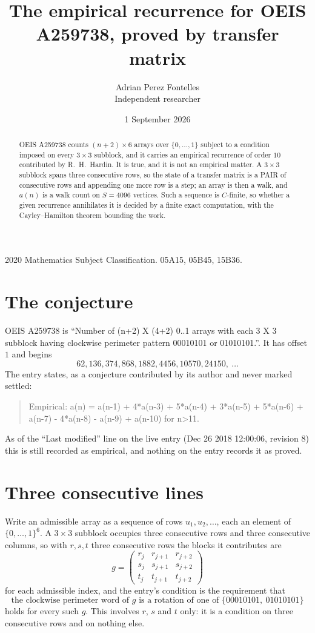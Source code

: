 \documentclass[11pt,a4paper]{article}
\title{The empirical recurrence for OEIS A259738, proved by transfer matrix}
\author{Adrian Perez Fontelles\\ \small Independent researcher}
\date{1 September 2026}
\theoremstyle{plain}
\theoremstyle{definition}
\begin{document}
\maketitle

\begin{abstract}
OEIS A259738 counts $(n+2)\times6$ arrays over $\{0,\dots,1\}$ subject to a condition imposed on
every $3\times3$ subblock, and it carries an empirical recurrence of order $10$
contributed by R.~H.~Hardin. It is true, and it is not an empirical matter. A $3\times3$
subblock spans three consecutive rows, so the state of a transfer matrix is a PAIR of
consecutive rows and appending one more row is a step; an array is then a walk, and
$a(n)$ is a walk count on $S=4096$ vertices. Such a sequence is $C$-finite, so whether a given
recurrence annihilates it is decided by a finite exact computation, with the Cayley--Hamilton
theorem bounding the work.
\end{abstract}

\noindent\small 2020 Mathematics Subject Classification. 05A15, 05B45, 15B36.\normalsize

\section{The conjecture}

OEIS A259738 is ``Number of (n+2) X (4+2) 0..1 arrays with each 3 X 3 subblock having clockwise perimeter pattern 00010101 or 01010101.''. It has offset $1$ and begins
\[
62, 136, 374, 868, 1882, 4456, 10570, 24150,\ \dots
\]
The entry states, as a conjecture contributed by its author and never marked settled:
\begin{quote}
Empirical: a(n) = a(n-1) + 4*a(n-3) + 5*a(n-4) + 3*a(n-5) + 5*a(n-6) + a(n-7) - 4*a(n-8) - a(n-9) + a(n-10) for n>11.
\end{quote}
As of the ``Last modified'' line on the live entry (Dec 26 2018 12:00:06, revision 8) this is still
recorded as empirical, and nothing on the entry records it as proved.

\section{Three consecutive lines}

Write an admissible array as a sequence of rows $u_1,u_2,\dots$, each an element of
$\{0,\dots,1\}^{6}$. A $3\times3$ subblock occupies three consecutive rows and
three consecutive columns, so with $r,s,t$ three consecutive rows the blocks it
contributes are
\[
g=\begin{pmatrix}r_j&r_{j+1}&r_{j+2}\\ s_j&s_{j+1}&s_{j+2}\\ t_j&t_{j+1}&t_{j+2}\end{pmatrix}
\]
for each admissible index, and the entry's condition is the requirement that
\[
\text{the clockwise perimeter word of }g\text{ is a rotation of one of }\{00010101,\ 01010101\}
\]
holds for every such $g$. This involves $r$, $s$ and $t$ only: it is a condition on
three consecutive rows and on nothing else.
\end{document}
